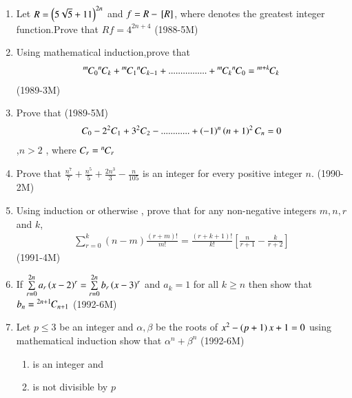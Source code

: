 \documentclass[journal,12pt,twocolumn]{IEEEtran}
\theoremstyle{remark}
\begin{document}
\begin{enumerate}
	    \item Let $ R =\left(5\sqrt{5}+11\right)^{2n} $ and $ f = R -{}\left[R\right] $, where \sbrak{} denotes the greatest integer function.Prove  that $ Rf =4^{2n+4 } $  \hfill {(1988-5M)}


	    \item Using mathematical induction,prove that
		    \begin{align*} {{}^{m}\mkern-1muC_{0}}{{}^{n}\mkern-1muC_{k}} +{{}^{m}\mkern-1muC_{1}}{{}^{n}\mkern-1muC_{k-1}}+................+{{}^{m}\mkern-1muC_{k}}{{}^{n}\mkern-1muC_{0}} ={{}^{m+k}\mkern-1muC_{k}} \end{align*}  \hfill{(1989-3M)}


	    \item Prove that \hfill{(1989-5M)}
		    \begin{align*} 
		    C_0-2^2C_1+3^2C_2-............+\left(-1\right)^n\left(n+1\right)^2C_n =0
		    \end{align*},$n>2$ , where $C_r ={{}^{n}\mkern-1muC_{r}}$
		    

	    \item Prove that   $ \frac{n^7}{7}+\frac{n^5}{5}+\frac{2n^3}{3}-\frac{n}{105}$ is an integer for every positive integer $ n$. \hfill{(1990-2M)}


	    \item Using induction or otherwise , prove that for any non-negative integers $m,n,r$ and $ k$,
		    \begin{align*} 
			    \sum_{r=0}^{k}(n-m)\frac{(r+m)!}{m!}= \frac{(r+k+1)!}{k!}[\frac{n}{r+1}-\frac{k}{r+2}]
		    \end{align*}
		     \hfill{(1991-4M)} 

	     \item If $ \sum\limits_{r=0}^{2n} a_r \left(x-2\right)^r=\sum\limits_{r=0}^{2n}b_r \left(x-3\right)^r $ and $ a_k =1 $ for all $k \geq  n$ then show that $ b_n = {{}^{2n+1}\mkern-1muC_{n+1}} $ \hfill{(1992-6M)}

	    \item Let $ p \leq 3 $ be an integer and $ \alpha , \beta $ be  the roots of $ x^2-\left(p+1\right)x+1=0 $ using mathematical induction show that $ \alpha^n  + \beta^n $ \hfill{(1992-6M)}
		    \begin{enumerate}[label=(\roman*)]

			    \item is an integer and   
		    \item is not divisible by $ p $ \end{enumerate}
				    
		    
 \end{enumerate}
    
    
\end{document}
